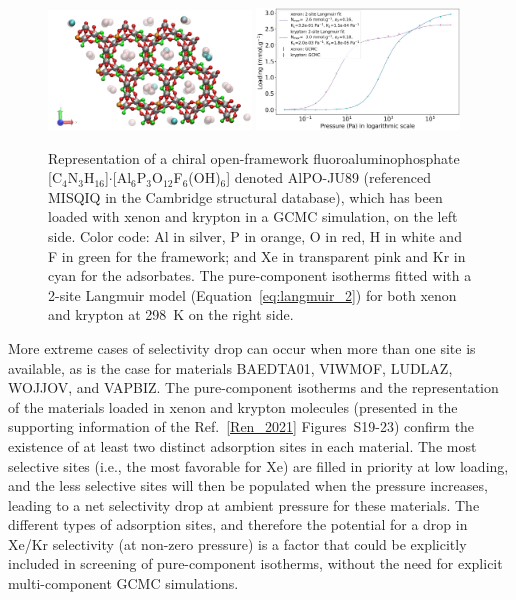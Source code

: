 \documentclass[main.tex]{subfiles}
\begin{document}
\begin{figure}[t]
  \centering
    \includegraphics[width=0.48\textwidth]{figures/2-thermo/MISQIQ_clean.jpg}\hfill
    \includegraphics[width=0.48\textwidth]{figures/2-thermo/MISQIQ_clean_isotherm_xenon_krypton_298K.jpg}
    \caption{Representation of a chiral open-framework fluoroaluminophosphate [C$_4$N$_3$H$_{16}$]$\cdot$[Al$_6$P$_3$O$_{12}$F$_6$(OH)$_6$] denoted AlPO-JU89 (referenced MISQIQ in the Cambridge structural database), which has been loaded with xenon and krypton in a GCMC simulation, on the left side.\cite{MISQIQ} Color code: Al in silver, P in orange, O in red, H in white and F in green for the framework; and Xe in transparent pink and Kr in cyan for the adsorbates. The pure-component isotherms fitted with a 2-site Langmuir model (Equation~\ref{eq:langmuir_2}) for both xenon and krypton at \SI{298}{\kelvin} on the right side.}
    \label{fgr:MISQIQ}
  \end{figure}

More extreme cases of selectivity drop can occur when more than one site is available, as is the case for materials BAEDTA01, VIWMOF, LUDLAZ, WOJJOV, and VAPBIZ. The pure-component isotherms and the representation of the materials loaded in xenon and krypton molecules (presented in the supporting information of the Ref.~\ref{Ren_2021} Figures~S19-23) confirm the existence of at least two distinct adsorption sites in each material. The most selective sites (i.e., the most favorable for Xe) are filled in priority at low loading, and the less selective sites will then be populated when the pressure increases, leading to a net selectivity drop at ambient pressure for these materials. The different types of adsorption sites, and therefore the potential for a drop in Xe/Kr selectivity (at non-zero pressure) is a factor that could be explicitly included in screening of pure-component isotherms, without the need for explicit multi-component GCMC simulations.
\end{document}
